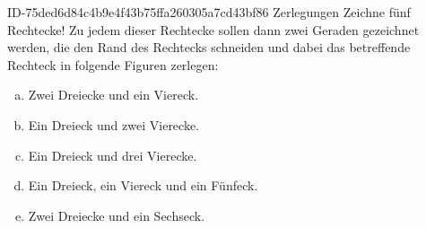 \begin{exercise}
      {ID-75ded6d84c4b9e4f43b75ffa260305a7cd43bf86}
      {Zerlegungen}
  \ifproblem\problem
    Zeichne fünf Rechtecke! Zu jedem dieser Rechtecke sollen dann zwei Geraden
    gezeichnet werden, die den Rand des Rechtecks schneiden und dabei das
    betreffende Rechteck in folgende Figuren zerlegen:
    \begin{enumerate}[a)]
      \squeeze
      \item Zwei Dreiecke und ein Viereck.
      \item Ein Dreieck und zwei Vierecke.
      \item Ein Dreieck und drei Vierecke.
      \item Ein Dreieck, ein Viereck und ein Fünfeck.
      \item Zwei Dreiecke und ein Sechseck.
    \end{enumerate}
  \fi
\end{exercise}
